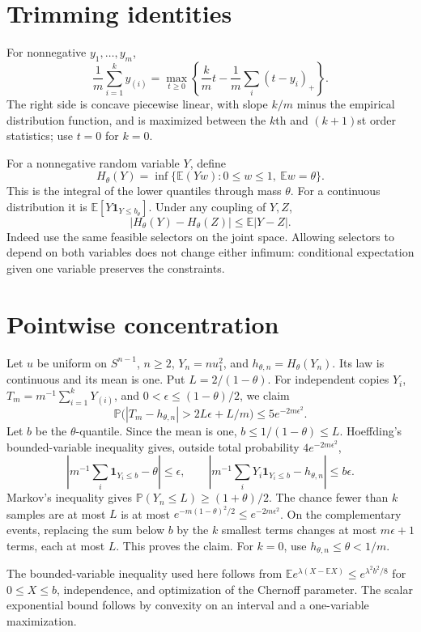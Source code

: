 \documentclass[11pt]{article}
\newcommand{\E}{\mathbb E}
\newcommand{\Prob}{\mathbb P}
\begin{document}
\section{Trimming identities}
For nonnegative $y_1,\ldots,y_m$,
\[
\frac1m\sum_{i=1}^k y_{(i)}=\max_{t\ge0}\left\{\frac km t-\frac1m\sum_i(t-y_i)_+\right\}.
\]
The right side is concave piecewise linear, with slope $k/m$ minus the empirical distribution function, and is maximized between the $k$th and $(k+1)$st order statistics; use $t=0$ for $k=0$.

For a nonnegative random variable $Y$, define
\[
H_\theta(Y)=\inf\{\E(Yw):0\le w\le1,\ \E w=\theta\}.
\]
This is the integral of the lower quantiles through mass $\theta$. For a continuous distribution it is $\E[Y\mathbf1_{Y\le b_\theta}]$. Under any coupling of $Y,Z$,
\[|H_\theta(Y)-H_\theta(Z)|\le\E|Y-Z|.\]
Indeed use the same feasible selectors on the joint space. Allowing selectors to depend on both variables does not change either infimum: conditional expectation given one variable preserves the constraints.
\section{Pointwise concentration}
Let $u$ be uniform on $S^{n-1}$, $n\ge2$, $Y_n=nu_1^2$, and $h_{\theta,n}=H_\theta(Y_n)$. Its law is continuous and its mean is one. Put $L=2/(1-\theta)$. For independent copies $Y_i$, $T_m=m^{-1}\sum_{i=1}^kY_{(i)}$, and $0<\epsilon\le(1-\theta)/2$, we claim
\[
\Prob\bigl(|T_m-h_{\theta,n}|>2L\epsilon+L/m\bigr)\le5e^{-2m\epsilon^2}.
\]
Let $b$ be the $\theta$-quantile. Since the mean is one, $b\le1/(1-\theta)\le L$. Hoeffding's bounded-variable inequality gives, outside total probability $4e^{-2m\epsilon^2}$,
\[
\left|m^{-1}\sum_i\mathbf1_{Y_i\le b}-\theta\right|\le\epsilon,\qquad
\left|m^{-1}\sum_iY_i\mathbf1_{Y_i\le b}-h_{\theta,n}\right|\le b\epsilon.
\]
Markov's inequality gives $\Prob(Y_n\le L)\ge(1+\theta)/2$. The chance fewer than $k$ samples are at most $L$ is at most $e^{-m(1-\theta)^2/2}\le e^{-2m\epsilon^2}$. On the complementary events, replacing the sum below $b$ by the $k$ smallest terms changes at most $m\epsilon+1$ terms, each at most $L$. This proves the claim. For $k=0$, use $h_{\theta,n}\le\theta<1/m$.

The bounded-variable inequality used here follows from $\E e^{\lambda(X-\E X)}\le e^{\lambda^2b^2/8}$ for $0\le X\le b$, independence, and optimization of the Chernoff parameter. The scalar exponential bound follows by convexity on an interval and a one-variable maximization.
\end{document}
